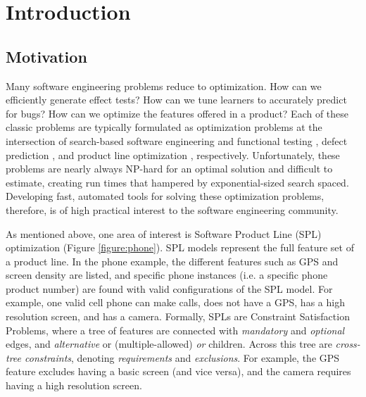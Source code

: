 \documentclass{sig-alternate-05-2015}
\begin{document}
%
%

%



\section{Introduction}
\subsection{Motivation}
Many software engineering problems reduce to optimization. How can we efficiently generate effect tests? How can we tune learners to accurately predict for bugs? How can we optimize the features offered in a product? Each of these classic problems are typically formulated as optimization problems at the intersection of search-based software engineering \cite{harman2001search} and functional testing \cite{beizer1995black}, defect prediction \cite{fenton1999critique}, and product line optimization \cite{kang1990feature}, respectively. Unfortunately, these problems are nearly always NP-hard for an optimal solution and difficult to estimate, creating run times that hampered by exponential-sized search spaced. Developing fast, automated tools for solving these optimization problems, therefore, is of high practical interest to the software engineering community.

As mentioned above, one area of interest is Software Product Line (SPL) optimization (Figure \ref{figure:phone}). SPL models represent the full feature set of a product line. In the phone example, the different features such as GPS and screen density are listed, and specific phone instances (i.e. a specific phone product number) are found with valid configurations of the SPL model. For example, one valid cell phone can make calls, does not have a GPS, has a high resolution screen, and has a camera. Formally, SPLs are Constraint Satisfaction Problems, where a tree of features are connected with \emph{mandatory} and \emph{optional} edges, and \emph{alternative} or (multiple-allowed) \emph{or} children. Across this tree are \emph{cross-tree constraints}, denoting \emph{requirements} and \emph{exclusions}. For example, the GPS feature excludes having a basic screen (and vice versa), and the camera requires having a high resolution screen.
\end{document}
